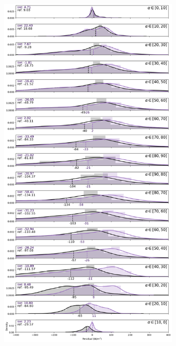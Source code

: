 \newpage

\begin{figure}[htb!]
    \begin{subfigure}{0.49\columnwidth}
        \includegraphics[width=\columnwidth, height=0.9\textheight]{figures/first_study/residual_errors_svr_site1_mae.png}

\end{subfigure}
\end{figure}
